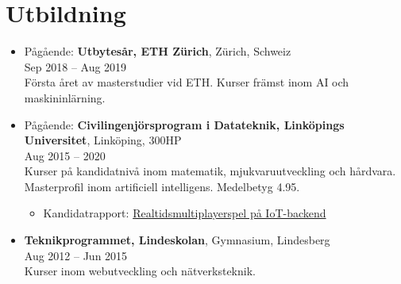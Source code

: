 \documentclass[12pt]{article}
\newcommand{\text}[2]{#2}
\newcommand{\text}[2]{#1}
\begin{document}
\section*{\text{Education}{Utbildning}}
\begin{itemize}
    \item \text{
            In progress: \textbf{Exchange Year, ETH Zürich}, Zürich, Switzerland\\
        }{
            Pågående: \textbf{Utbytesår, ETH Zürich}, Zürich, Schweiz\\
        }
        Sep 2018 -- Aug 2019\\
        \text{
            First year of my master as an exchange student at ETH. Courses mainly in AI and machine learning.
        }{
            Första året av masterstudier vid ETH. Kurser främst inom AI och maskininlärning.
        }

    \item \text{
            In progress: \textbf{Master programme in Computer Science and Engineering (Swedish Civilingenjörsprogram), Linköping University}, Linköping, 300 ECTS\\
        }{
            Pågående: \textbf{Civilingenjörsprogram i Datateknik, Linköpings Universitet}, Linköping, 300HP\\
        }
        Aug 2015 -- 2020\\
        \text{
            Bachelor courses in mathematics, software development and hardware. Master focused on artificial intelligence. Mean grade of 4.95.
        }{
            Kurser på kandidatnivå inom matematik, mjukvaruutveckling och hårdvara. Masterprofil inom artificiell intelligens. Medelbetyg 4.95.
        }
        \begin{itemize}
            \item \text{
                    Bachelor thesis: \href{http://urn.kb.se/resolve?urn=urn:nbn:se:liu:diva-149042}{Real-time Multiplayer Game on IoT-backend}
                }{
                    Kandidatrapport: \href{http://urn.kb.se/resolve?urn=urn:nbn:se:liu:diva-149042}{Realtidsmultiplayerspel på IoT-backend}
                }
        \end{itemize}

    \item \text{
            \textbf{Technology Program, Lindeskolan}, Upper secondary school, Lindesberg\\
        }{
            \textbf{Teknikprogrammet, Lindeskolan}, Gymnasium, Lindesberg\\
        }
        Aug 2012 -- Jun 2015\\
        \text{
            Courses in web development and network technologies.
        }{
            Kurser inom webutveckling och nätverksteknik.
        }

\end{itemize}
\end{document}
